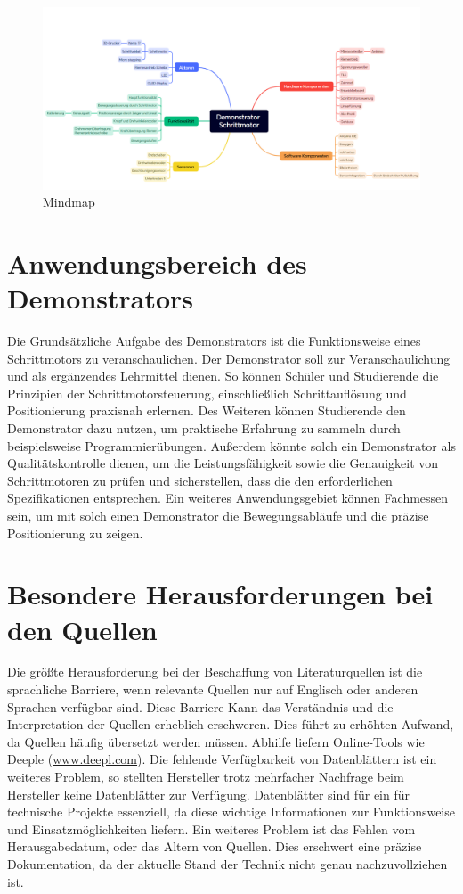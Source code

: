 \begin{figure}[H]
	\begin{center}
		\includegraphics[width=\textwidth]{../Appendix/Mindmap/Mindmap.png}
		\caption{Mindmap} \label{Mindmap}
	\end{center}
\end{figure} 

\section{Anwendungsbereich des Demonstrators}

Die Grundsätzliche Aufgabe des Demonstrators ist die Funktionsweise eines Schrittmotors zu veranschaulichen. Der Demonstrator soll zur Veranschaulichung und als ergänzendes Lehrmittel dienen. So können Schüler und Studierende die Prinzipien der Schrittmotorsteuerung, einschließlich Schrittauflösung und Positionierung praxisnah erlernen. Des Weiteren können Studierende den Demonstrator dazu nutzen, um praktische Erfahrung zu sammeln durch beispielsweise Programmierübungen. Außerdem könnte solch ein Demonstrator als Qualitätskontrolle dienen, um die Leistungsfähigkeit sowie die Genauigkeit von Schrittmotoren zu prüfen und sicherstellen, dass die den erforderlichen Spezifikationen entsprechen. Ein weiteres Anwendungsgebiet können Fachmessen sein, um mit solch einen Demonstrator die Bewegungsabläufe und die präzise Positionierung zu zeigen. 

\section{Besondere Herausforderungen bei den Quellen}

Die größte Herausforderung bei der Beschaffung von Literaturquellen ist die sprachliche Barriere, wenn relevante Quellen nur auf Englisch oder anderen Sprachen verfügbar sind. Diese Barriere Kann das Verständnis und die Interpretation der Quellen erheblich erschweren. Dies führt zu erhöhten Aufwand, da Quellen häufig übersetzt werden müssen. Abhilfe liefern Online-Tools wie Deeple (\href{https://www.deepl.com/de/translator}{www.deepl.com}).
Die fehlende Verfügbarkeit von Datenblättern ist ein weiteres Problem, so stellten Hersteller trotz mehrfacher Nachfrage beim Hersteller keine Datenblätter zur Verfügung. Datenblätter sind für ein für technische Projekte essenziell, da diese wichtige Informationen zur Funktionsweise und Einsatzmöglichkeiten liefern. Ein weiteres Problem ist das Fehlen vom Herausgabedatum, oder das Altern von Quellen. Dies erschwert eine präzise Dokumentation, da der aktuelle Stand der Technik nicht genau nachzuvollziehen ist. 